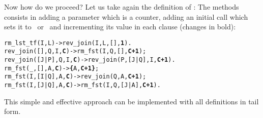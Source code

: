 Now how do we proceed? Let us take again the definition of
:
 The methods consists in adding a
parameter which is a counter, adding an initial call which sets it to
~or~ and incrementing its value in each clause
(changes in bold):
\begin{alltt}
rm_lst_tf(I,L)        -> rev_join(I,L,[],\textbf{1}).\hfill% \emph{One}
rev_join(   [],Q,I,\textbf{C}) -> rm_fst(I,Q,[],\textbf{C+1});
rev_join([J|P],Q,I,\textbf{C}) -> rev_join(P,[J|Q],I,\textbf{C+1}).
rm_fst(_,   [],A,\textbf{C})   -> \textbf{\{}A,\textbf{C+1\}};\hfill% \emph{Result is a pair}
rm_fst(I,[I|Q],A,\textbf{C})   -> rev_join(Q,A,\textbf{C+1});
rm_fst(I,[J|Q],A,\textbf{C})   -> rm_fst(I,Q,[J|A],\textbf{C+1}).
\end{alltt}
This simple and effective approach can be implemented with all
definitions in tail form. 

